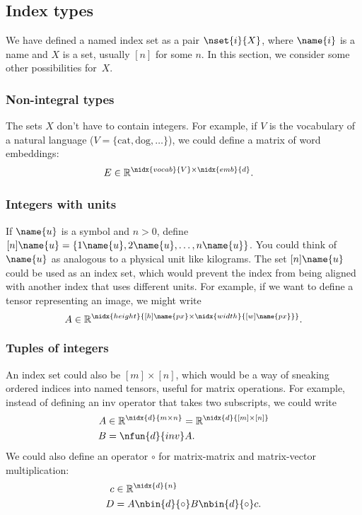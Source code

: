 \subsection{Index types}

We have defined a named index set as a pair $\nset{i}{X}$, where $\name{i}$ is a name and $X$ is a set, usually $[n]$ for some $n$. In this section, we consider some other possibilities for~$X$.

\subsubsection{Non-integral types}

The sets $X$ don't have to contain integers. For example, if $V$ is the vocabulary of a natural language ($V = \{ \text{cat}, \text{dog}, \ldots \}$), we could define a matrix of word embeddings:
\begin{align*}
  E &\in \mathbb{R}^{\nidx{vocab}{V} \times \nidx{emb}{d}}.
\end{align*}

\subsubsection{Integers with units}

If $\name{u}$ is a symbol and $n > 0$, define $[n]\name{u} = \{1\name{u}, 2\name{u}, \ldots, n\name{u}\}$. You could think of $\name{u}$ as analogous to a physical unit like kilograms. The set $[n]\name{u}$ could be used as an index set, which would prevent the index from being aligned with another index that uses different units. For example, if we want to define a tensor representing an image, we might write
\[ A \in \mathbb{R}^{\nidx{height}{[h]\name{px} \times \nidx{width}{[w]\name{px}}}}. \]

\subsubsection{Tuples of integers}

An index set could also be $[m] \times [n]$, which would be a way of sneaking ordered indices into named tensors, useful for matrix operations. For example, instead of defining an $\text{inv}$ operator that takes two subscripts, we could write
\begin{align*}
  A &\in \mathbb{R}^{\nidx{d}{{m\times n}}} = \mathbb{R}^{\nidx{d}{{[m]\times [n]}}} \\
  B &= \nfun{d}{inv} A.
\end{align*}
We could also define an operator $\circ$ for matrix-matrix and matrix-vector multiplication:
\begin{align*}
  c &\in \mathbb{R}^{\nidx{d}{n}} \\
  D &= A \nbin{d}{\circ} B \nbin{d}{\circ} c.
\end{align*}
